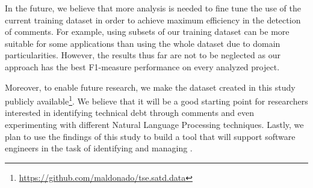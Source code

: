 In the future, we believe that more analysis is needed to fine tune the use of the current training dataset in order to achieve maximum efficiency in the detection of \SATD comments. For example, using subsets of our training dataset can be more suitable for some applications than using the whole dataset due to domain particularities. However, the results thus far are not to be neglected as our approach has the best F1-measure performance on every analyzed project.   


Moreover, to enable future research, we make the dataset created in this study publicly available\footnote{\url{https://github.com/maldonado/tse.satd.data}}. We believe that it will be a good starting point for researchers interested in identifying technical debt through comments and even experimenting with different Natural Language Processing techniques. Lastly, we plan to use the findings of this study to build a tool that will support software engineers in the task of identifying and managing \SATD. 



